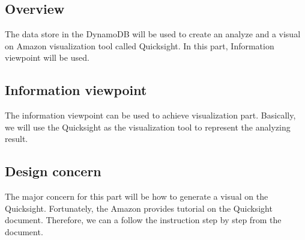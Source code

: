     \subsection{Overview}
    The data store in the DynamoDB will be used to create an analyze and a visual on Amazon visualization tool called Quicksight. In this part, Information viewpoint will be used.
    \subsection{Information viewpoint}
    The information viewpoint can be used to achieve visualization part. Basically, we will use the Quicksight as the visualization tool to represent the analyzing result.
    \subsection{Design concern} 
    The major concern for this part will be how to generate a visual on the Quicksight. Fortunately, the Amazon provides tutorial on the Quicksight document. Therefore, we can a follow the instruction step by step from the document.    
